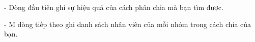 - Dòng đầu tiên ghi sự hiệu quả của cách phân chia mà bạn tìm được.   


   - M dòng tiếp theo ghi danh sách nhân viên của mỗi nhóm trong cách chia của bạn.